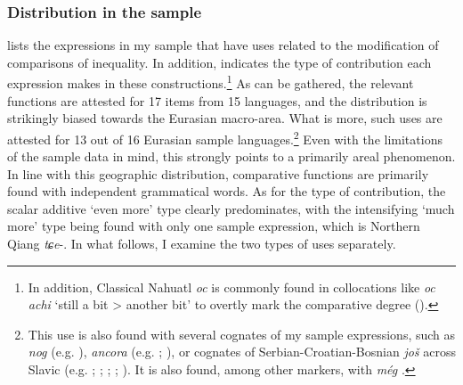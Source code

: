 {\subsubsection{Distribution in the sample}
 lists the expressions in my sample that have uses related to the modification of comparisons of inequality. In addition,  indicates the type of contribution each expression makes in these constructions.\footnote{In addition, Classical Nahuatl \textit{oc} is commonly found in collocations like \textit{oc} \textit{achi} \lq still a bit > another bit\rq{ }to overtly mark the comparative degree ().} As can be gathered, the relevant functions are attested for 17 items from 15 languages, and the distribution is strikingly biased towards the Eurasian macro-area. What is more, such uses are attested for 13 out of 16 Eurasian sample languages.\footnote{This use is also found with several cognates of my sample expressions, such as  \textit{nog} (e.g. \cite[124]{Vandeweghe1984}),  \textit{ancora} (e.g. \cite{Tovena1994}; \cite{Vegnaduzzo2000}), or cognates of Serbian-Croatian-Bosnian \textit{još} across Slavic (e.g. \cite[s.v. \textit{jeszcze}]{PWN}; \cite[s.v. \textit{ještě}]{SSJC}; \cite[s.v. \textit{ще}]{CYM11}; \cite[s.v. \textit{šè}]{SSKJ}; \cite[s.v. \textit{ešte}]{KSS4}). It is also found, among other markers, with  \textit{még} \parencite{CsirmazSlade2020}.} Even with the limitations of the sample data in mind, this strongly points to a primarily areal phenomenon. In line with this geographic distribution, comparative functions are primarily found with independent grammatical words. As for the type of contribution, the scalar additive \lq even more\rq{ }type clearly predominates, with the intensifying \lq much more\rq{ }type being found with only one sample expression, which is Northern Qiang \mbox{\textit{tɕe}-}. In what follows, I examine the two types of uses separately.

}

